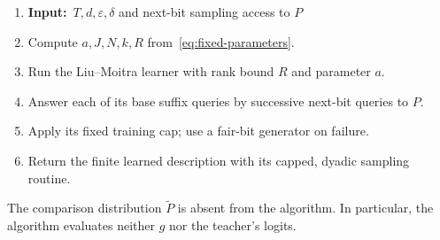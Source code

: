 \documentclass[11pt]{article}
\newenvironment{algorithmic}[1][1]
{\begin{enumerate}[label=\arabic*:,leftmargin=2em,itemsep=3pt]}
{\end{enumerate}}
\newcommand{\Require}{\item[]\textbf{Input:}\ }
\newcommand{\State}{\item}
\theoremstyle{definition}
\theoremstyle{remark}
\begin{document}
\begin{algorithm}[H]
\caption{Conditional-sample learning at fixed logit rank}\label{alg:probability-route}
\begin{algorithmic}[1]
\Require $T,d,\varepsilon,\delta$ and next-bit sampling access to $P$
\State Compute $a,J,N,k,R$ from~\eqref{eq:fixed-parameters}.
\State Run the Liu--Moitra learner with rank bound $R$ and parameter $a$.
\State Answer each of its base suffix queries by successive next-bit queries to $P$.
\State Apply its fixed training cap; use a fair-bit generator on failure.
\State Return the finite learned description with its capped, dyadic sampling routine.
\end{algorithmic}
\end{algorithm}

The comparison distribution $\widetilde P$ is absent from the algorithm. In particular, the algorithm evaluates neither $g$ nor the teacher's logits.
\end{document}
